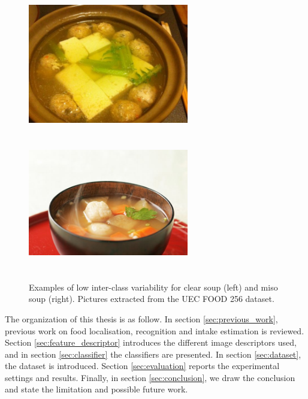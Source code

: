 \begin{figure}
    \centering
    \includegraphics[width=7cm, height=6cm]{img/clear_soup.jpg}
    \includegraphics[width=7cm, height=6cm]{img/miso_soup.jpg}
    \caption[Examples of low inter-class variability for kaya toast]{Examples of low inter-class variability for clear soup (left) and miso soup (right). Pictures extracted from the UEC FOOD 256 dataset.}
    \label{fig:inter-class_variability}
\end{figure}

The organization of this thesis is as follow. In section \ref{sec:previous_work}, previous work on food localisation, recognition and intake estimation is reviewed. Section \ref{sec:feature_descriptor} introduces the different image descriptors used, and in section \ref{sec:classifier} the classifiers are presented. In section \ref{sec:dataset}, the dataset is introduced. Section \ref{sec:evaluation} reports the experimental settings and results. Finally, in section \ref{sec:conclusion}, we draw the conclusion and state the limitation and possible future work.
